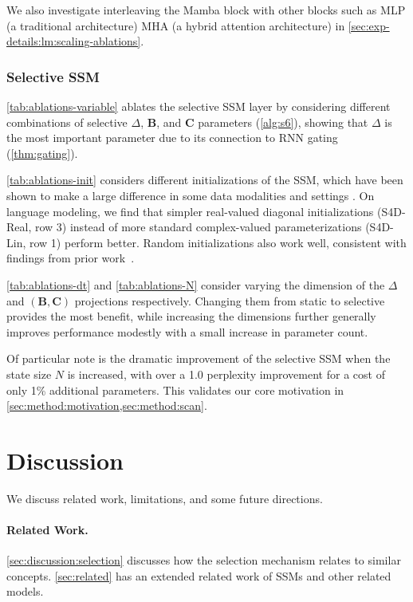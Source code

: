 We also investigate interleaving the Mamba block with other blocks such as MLP (a traditional architecture) MHA (a hybrid attention architecture) in \ref{sec:exp-details:lm:scaling-ablations}.

\subsubsection{Selective SSM}

\ref{tab:ablations-variable} ablates the selective SSM layer by considering different combinations of selective $\Delta$, $\bm{B}$, and $\bm{C}$ parameters (\ref{alg:s6}),
showing that $\Delta$ is the most important parameter due to its connection to RNN gating (\ref{thm:gating}).

\ref{tab:ablations-init} considers different initializations of the SSM, which have been shown to make a large difference in some data modalities and settings \citep{gu2022efficiently,gu2022parameterization}.
On language modeling, we find that simpler real-valued diagonal initializations (S4D-Real, row 3) instead of more standard complex-valued parameterizations (S4D-Lin, row 1) perform better. Random initializations also work well, consistent with findings from prior work~\citep{mehta2023long}.

\ref{tab:ablations-dt} and \ref{tab:ablations-N} consider varying the dimension of the $\Delta$ and $(\bm{B}, \bm{C})$ projections respectively. Changing them from static to selective provides the most benefit, while increasing the dimensions further generally improves performance modestly with a small increase in parameter count.

Of particular note is the dramatic improvement of the selective SSM when the state size $N$ is increased, with over a 1.0 perplexity improvement for a cost of only 1\% additional parameters. This validates our core motivation in \ref{sec:method:motivation,sec:method:scan}.

\section{Discussion}
\label{sec:discussion}

We discuss related work, limitations, and some future directions.

\paragraph{Related Work.}
\ref{sec:discussion:selection} discusses how the selection mechanism relates to similar concepts.
\ref{sec:related} has an extended related work of SSMs and other related models.

